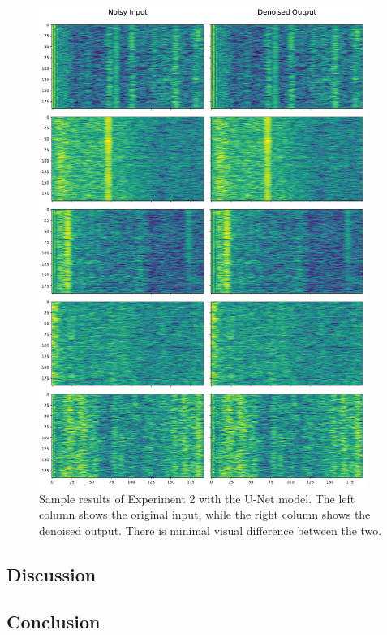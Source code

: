 \begin{figure}[p]
    \centering
    \includegraphics[width=0.95\textwidth]{img/ch6/in_eq_out/unet/combined_spectrograms.pdf}
    \caption{Sample results of Experiment 2 with the U-Net model. The left column shows the original input, while the right column shows the denoised output. There is minimal visual difference between the two.}
\end{figure}

\subsection{Discussion}

\subsection{Conclusion}

